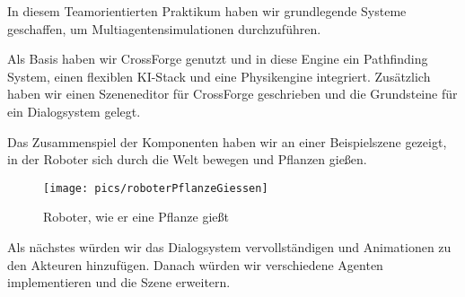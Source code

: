 In diesem Teamorientierten Praktikum haben wir grundlegende Systeme geschaffen, um Multiagentensimulationen durchzuführen. 

Als Basis haben wir CrossForge genutzt und in diese Engine ein Pathfinding System, einen flexiblen KI-Stack und eine Physikengine integriert. Zusätzlich haben wir einen Szeneneditor für CrossForge geschrieben und die Grundsteine für ein Dialogsystem gelegt.

Das Zusammenspiel der Komponenten haben wir an einer Beispielszene gezeigt, in der Roboter sich durch die Welt bewegen und Pflanzen gießen.

\begin{figure}[h]
	\centering
	\texttt{[image: pics/roboterPflanzeGiessen]}
	\caption{Roboter, wie er eine Pflanze gießt}
\end{figure}

Als nächstes würden wir das Dialogsystem vervollständigen und Animationen zu den Akteuren hinzufügen. Danach würden wir verschiedene Agenten implementieren und die Szene erweitern.